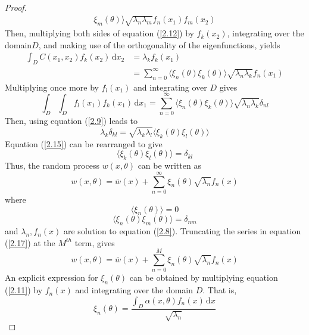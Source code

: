 \documentclass{article}
\begin{document}
\begin{proof}
\begin{equation}
\begin{array}{ll}
\xi_m (\theta) \rangle \sqrt{\lambda_n \lambda_m} f_n (x_1) f_m (x_2)
\end{array} \label{2.12}
\end{equation}
Then, multiplying both sides of equation (\ref{2.12}) by $f_k (x_2)$,
integrating over the domain$D$, and making use of the orthogonality of the
eigenfunctions, yields
\begin{equation}
\begin{array}{ll}
\int_D C (x_1, x_2) f_k (x_2) \, \mathrm{d}x_2 & = \lambda_k f_k (x_1)\\
& = \sum_{n = 0}^{\infty} \langle \xi_n (\theta) \xi_k (\theta) \rangle
\sqrt{\lambda_n \lambda_k} f_n (x_1)
\end{array}
\end{equation}
Multiplying once more by $f_l (x_1)$ and integrating over $D$ gives
\begin{equation}
\int_D \int_D f_l (x_1) f_k (x_1) \, \mathrm{d}x_1 = \sum_{n = 0}^{\infty} \langle
\xi_n (\theta) \xi_k (\theta) \rangle \sqrt{\lambda_n \lambda_k}
\delta_{nl}
\end{equation}
Then, using equation (\ref{2.9}) leads to
\begin{equation}
\lambda_k \delta_{kl} = \sqrt{\lambda_k \lambda_l} \langle \xi_k (\theta)
\xi_l (\theta) \rangle \label{2.15}
\end{equation}
Equation (\ref{2.15}) can be rearranged to give
\begin{equation}
\langle \xi_k (\theta) \xi_l (\theta) \rangle = \delta_{kl}
\end{equation}
Thus, the random process $w (x, \theta)$ can be written as
\begin{equation}
w (x, \theta) = \bar{w} (x) + \sum_{n = 0}^{\infty} \xi_n (\theta)
\sqrt{\lambda_n} f_n (x) \label{2.17}
\end{equation}
where
\begin{equation}
\langle \xi_n (\theta) \rangle = 0
\end{equation}
\begin{equation}
\langle \xi_n (\theta) \xi_m (\theta) \rangle = \delta_{nm} \label{2.19}
\end{equation}
and $\lambda_n, f_n (x)$ are solution to equation (\ref{2.8}). Truncating
the series in equation (\ref{2.17}) at the $M^{th}$ term, gives
\begin{equation}
w (x, \theta) = \bar{w} (x) + \sum_{n = 0}^M \xi_n (\theta)
\sqrt{\lambda_n} f_n (x) \label{2.20}
\end{equation}
An explicit expression for $\xi_n (\theta)$ can be obtained by multiplying
equation (\ref{2.11}) by $f_n (x)$ and integrating over the domain $D$. That
is,
\begin{equation}
\xi_n (\theta) = \frac{\int_D \alpha (x, \theta) f_n (x)
\, \mathrm{d}x}{\sqrt{\lambda_n}} \label{2.21}
\end{equation}
\end{proof}
\end{document}
